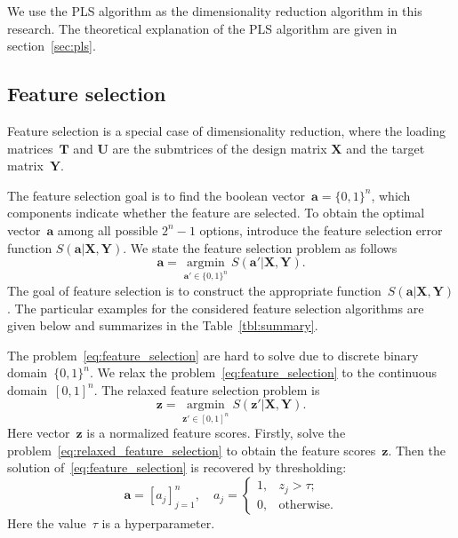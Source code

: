 \documentclass[12pt,oneside]{article}
\theoremstyle{definition}
\newcommand{\ba}{\mathbf{a}}
\newcommand{\bz}{\mathbf{z}}
\newcommand{\bY}{\mathbf{Y}}
\newcommand{\bX}{\mathbf{X}}
\newcommand{\bT}{\mathbf{T}}
\newcommand{\bU}{\mathbf{U}}
\newcommand{\argmin}{\mathop{\arg \min}\limits}
\begin{document}
We use the PLS algorithm as the dimensionality reduction algorithm in this research.
The theoretical explanation of the PLS algorithm are given in section~\ref{sec:pls}.

 \subsection{Feature selection}
 Feature selection is a special case of dimensionality reduction, where the loading matrices~$\bT$ and $\bU$ are the submtrices of the design matrix $\bX$ and the target matrix~$\bY$.
 
 The feature selection goal is to find the boolean vector~$\ba = \{0, 1\}^n$, which components indicate whether the feature are selected. 
 To obtain the optimal vector~$\ba$ among all possible $2^n - 1$ options, introduce the feature selection error function $S(\ba | \bX, \bY)$. 
 We state the feature selection problem as follows 
\begin{equation}
	\ba = \argmin_{\ba' \in \{0, 1\}^n} S(\ba' | \bX, \bY).
	\label{eq:feature_selection}
\end{equation}
The goal of feature selection is to construct the appropriate function~$S(\ba | \bX, \bY)$. The particular examples for the considered feature selection algorithms are given below and summarizes in the Table~\ref{tbl:summary}.

The problem~\ref{eq:feature_selection} are hard to solve due to discrete binary domain~$\{0, 1\}^n$. We relax the problem~\ref{eq:feature_selection} to the continuous domain~$[0, 1]^n$. The relaxed feature selection problem is
\begin{equation}
\bz = \argmin_{\bz' \in [0, 1]^n} S(\bz' | \bX, \bY).
\label{eq:relaxed_feature_selection}
\end{equation}
Here vector~$\bz$ is a normalized feature scores.
Firstly, solve the problem~\ref{eq:relaxed_feature_selection} to obtain the feature scores~$\bz$. 
Then the solution of~\ref{eq:feature_selection} is recovered by thresholding:
\begin{equation}
\ba = [a_j]_{j=1}^n, \quad 
a_j = \begin{cases}
1, & z_j > \tau; \\
0, & \text{otherwise}.
\end{cases}
\end{equation}
Here the value~$\tau$ is a hyperparameter. 
\end{document}
